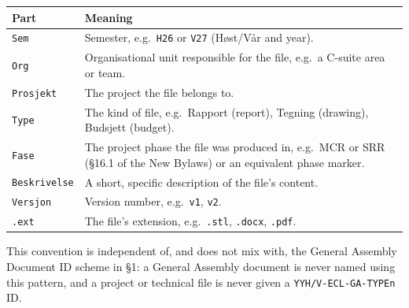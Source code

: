 \documentclass{../../../Common/Latex/Templates/rapport}
\begin{document}
\begin{longtable}{|L{2.6cm}|L{11cm}|}
  \hline
  \textbf{Part}        & \textbf{Meaning}                                                                                                       \\
  \hline
  \endhead
  \texttt{Sem}         & Semester, e.g.\ \texttt{H26} or \texttt{V27} (Høst/Vår and year).                                                      \\
  \hline
  \texttt{Org}         & Organisational unit responsible for the file, e.g.\ a C-suite area or team.                                            \\
  \hline
  \texttt{Prosjekt}    & The project the file belongs to.                                                                                       \\
  \hline
  \texttt{Type}        & The kind of file, e.g.\ Rapport (report), Tegning (drawing), Budsjett (budget).                                        \\
  \hline
  \texttt{Fase}        & The project phase the file was produced in, e.g.\ MCR or SRR (\S16.1 of the New Bylaws) or an equivalent phase marker. \\
  \hline
  \texttt{Beskrivelse} & A short, specific description of the file's content.                                                                   \\
  \hline
  \texttt{Versjon}     & Version number, e.g.\ \texttt{v1}, \texttt{v2}.                                                                        \\
  \hline
  \texttt{.ext}        & The file's extension, e.g.\ \texttt{.stl}, \texttt{.docx}, \texttt{.pdf}.                                              \\
  \hline
\end{longtable}

This convention is independent of, and does not mix with, the General Assembly Document ID scheme in \S1: a General Assembly document is never named using this pattern, and a project or technical file is never given a \texttt{YYH/V-ECL-GA-TYPEn} ID.
\end{document}

